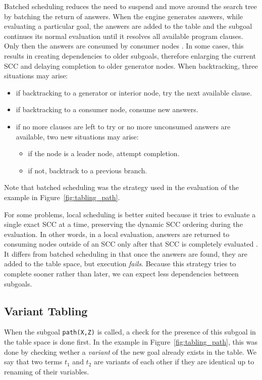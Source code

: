 Batched scheduling reduces the need to suspend and move around the search tree by batching the return of answers.
When the engine generates answers, while evaluating a particular goal, the answers are added to the table and
the subgoal continues its normal evaluation until it resolves all available program clauses. Only then the answers
are consumed by consumer nodes \cite{Freire-96}. In some cases, this results in creating dependencies to older
subgoals, therefore enlarging the current SCC and delaying completion to older generator nodes. When backtracking,
three situations may arise:

\begin{itemize}
  \item if backtracking to a generator or interior node, try the next available clause.
  \item if backtracking to a consumer node, consume new answers.
  \item if no more clauses are left to try or no more unconsumed answers are available, two new situations may arise:
    \begin{itemize}
      \item if the node is a leader node, attempt completion.
      \item if not, backtrack to a previous branch.
    \end{itemize}
\end{itemize}

Note that batched scheduling was the strategy used in the evaluation of the example in Figure~\ref{fig:tabling_path}.

For some problems, local scheduling is better suited because it tries to evaluate a single exact SCC at a time, preserving the dynamic
SCC ordering during the evaluation. In other words, in a local evaluation, answers are returned to consuming nodes outside of an SCC only after that
SCC is completely evaluated \cite{Freire-96}.
It differs from batched scheduling in that once the answers are found, they are added to the table space, but execution
\textit{fails}. Because this strategy tries to complete sooner rather than later, we can expect less dependencies between subgoals.

\subsection{Variant Tabling} \label{sec:variant_tabling}

When the subgoal \texttt{path(X,Z)} is called, a check for the presence of this subgoal in the table space is done first.
In the example in Figure~\ref{fig:tabling_path}, this was done by checking wether a \textit{variant} of the new goal already
exists in the table. We say that two terms $t_1$ and $t_2$ are variants of each other if they are identical up to renaming of their
variables.

